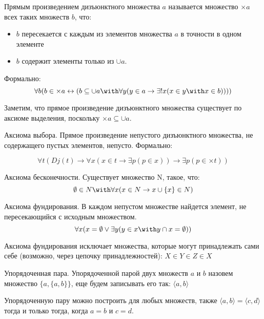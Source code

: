 \begin{definition}Прямым произведением дизъюнктного множества $a$ называется 
множество $\times a$ всех таких множеств $b$, что:
\begin{itemize}
\item $b$ пересекается с каждым из элементов множества $a$ в точности в одном элементе
\item $b$ содержит элементы только из $\cup a$.
\end{itemize}

Формально:
$$\forall b (b \in \times a \leftrightarrow (b \subseteq \cup a \with \forall y (y \in a \rightarrow \exists ! x (x \in y \with x \in b))))$$
\end{definition}

Заметим, что прямое произведение дизъюнктного множества
существует по аксиоме выделения, поскольку $\times a \subseteq \cup a$.

\begin{axiom}{Аксиома выбора.}
Прямое произведение непустого дизъюнктного множества, 
не содержащего пустых элементов, непусто.
Формально: 

$$\forall t (Dj (t) \rightarrow 
\forall x (x \in t \rightarrow \exists p (p \in x)) \rightarrow
\exists p (p \in \times t))$$
\end{axiom}

\begin{axiom}{Аксиома бесконечности.}
Существует множество N, такое, что:
$$\emptyset \in N \with \forall x(x \in N \rightarrow x\cup\{x\} \in N)$$
\end{axiom}

\begin{axiom}{Аксиома фундирования.}
В каждом непустом множестве найдется элемент, не пересекающийся с исходным множеством.
$$\forall x (x = \emptyset \vee \exists y (y \in x \with y \cap x = \emptyset))$$
\end{axiom}

Аксиома фундирования исключает множества, которые могут принадлежать 
сами себе (возможно, через цепочку принадлежностей):
$X \in Y \in Z \in X$

\begin{definition}{Упорядоченная пара.}
Упорядоченной парой двух множеств $a$ и $b$ назовем множество
$\{a,\{a,b\}\}$, еще будем записывать его так: $\langle{}a,b\rangle$
\end{definition}

\begin{lemma}
Упорядоченную пару можно построить для любых множеств, также 
$\langle{}a,b\rangle = \langle{}c,d\rangle$ тогда и только тогда,
когда $a = b$ и $c = d$.
\end{lemma}

